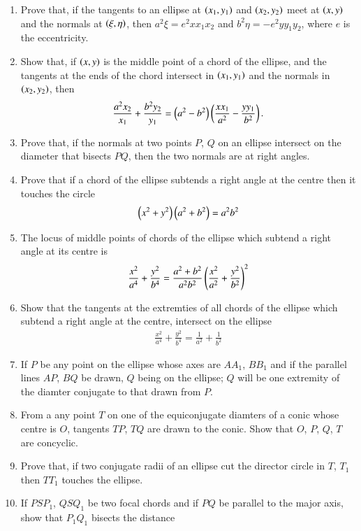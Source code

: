 \begin{enumerate}[label=\arabic*.,ref=\thesubsection.\theenumi]
\item Prove that, if the tangents to an ellipse at $\left(x_1,y_1\right)$ and $\left(x_2,y_2\right)$ meet at $\left(x,y\right)$ and the normals at
$\left(\xi,\eta\right)$, then $a^2\xi=e^2xx_1x_2$ and $b^2\eta = -e^2yy_1y_2$, where $e$ is the eccentricity.
\item Show that, if $\left(x,y\right)$ is the middle point of a chord of the ellipse,
and the tangents at the ends of the chord intersect in $\left(x_1,y_1\right)$ and the normals
in $\left(x_2,y_2\right)$, then
\begin{align*}
\frac{a^2x_2}{x_1}+\frac{b^2y_2}{y_1}=\left(a^2-b^2\right)\left(\frac{xx_1}{a^2}-\frac{yy_1}{b^2}\right).
\end{align*}
\item Prove that, if the normals at two points $P$, $Q$ on an ellipse intersect on the diameter
that bisects $PQ$, then the two normals are at right angles.
\item Prove that if a chord of the ellipse subtends a right angle at the centre
then it touches the circle
\begin{align*}
\left(x^2+y^2\right)\left(a^2+b^2\right) = a^2b^2
\end{align*}
\item The locus of middle points of chords of the ellipse which subtend a right angle at its centre is
\begin{align*}
\frac{x^2}{a^4}+\frac{y^2}{b^4}=\frac{a^2+b^2}{a^2b^2}\left(\frac{x^2}{a^2}+\frac{y^2}{b^2}\right)^2
\end{align*}
\item Show that the tangents at the extremties of all chords of the
ellipse which subtend a right angle at the centre, intersect on the ellipse
\begin{align*}
\frac{x^2}{a^4}+\frac{y^2}{b^4}=\frac{1}{a^2}+\frac{1}{b^2}
\end{align*}
\item If $P$ be any point on the ellipse whose axes are $AA_1$, $BB_1$ and if the parallel lines
$AP$, $BQ$ be drawn, $Q$ being on the ellipse; $Q$ will be one
extremity of the diamter conjugate to that drawn from $P$.
\item From a any point $T$ on one of the equiconjugate diamters of a conic whose centre is $O$, tangents $TP$, $TQ$ are drawn to 
the conic.  Show that $O$, $P$, $Q$, $T$ are concyclic.
\item Prove that, if two conjugate radii of an ellipse cut the
director circle in $T$, $T_1$ then $TT_1$ touches the ellipse.
\item If $PSP_1$, $QSQ_1$ be two focal chords and if $PQ$ be parallel to the major axis, show that $P_1Q_1$ bisects the distance

\end{enumerate}

